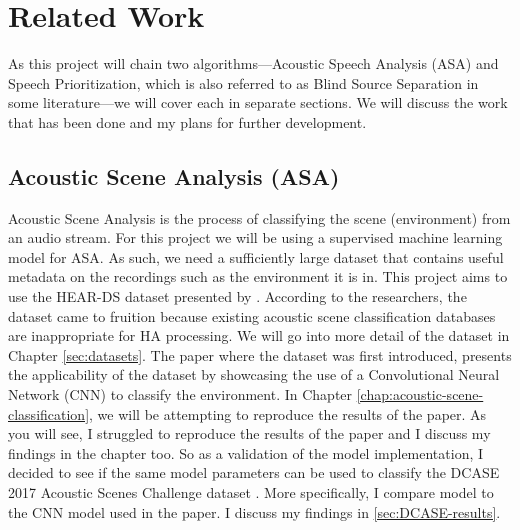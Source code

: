 \documentclass[logo,bsc,singlespacing,parskip,online]{infthesis}
\begin{document}




\section{Related Work}
As this project will chain two algorithms—Acoustic Speech Analysis (ASA) and Speech Prioritization, which is also referred to as Blind Source Separation in some literature—we will cover each in separate sections.
We will discuss the work that has been done and my plans for further development.

\subsection{Acoustic Scene Analysis (ASA)}
Acoustic Scene Analysis is the process of classifying the scene (environment) from an audio stream. For this project 
we will be using a supervised machine learning model for ASA. As such, we need
a sufficiently large dataset that contains useful metadata on the recordings such as the environment it is in.
This project aims to use the HEAR-DS dataset presented by \citet{Huwel2020HearDS}. According to the researchers, 
the dataset came to fruition because existing acoustic scene classification databases are inappropriate for 
HA processing. We will go into more detail of the dataset in Chapter \ref{sec:datasets}.
The paper where the dataset was first introduced, presents the applicability 
of the dataset by showcasing the use of a Convolutional Neural Network (CNN) to classify the environment.
In Chapter \ref{chap:acoustic-scene-classification}, we will be attempting to reproduce the results of the paper. 
As you will see, I struggled to reproduce the results of the paper and I discuss my findings in the chapter too.
So as a validation of the model implementation, I decided to see if the same model parameters 
can be used to classify the DCASE 2017 Acoustic Scenes Challenge dataset \cite{DCASE2017challenge}.
More specifically, I compare \citet{schindler_multi-temporal_2018} model to the CNN model used in the paper.
I discuss my findings in \ref{sec:DCASE-results}.
\end{document}
